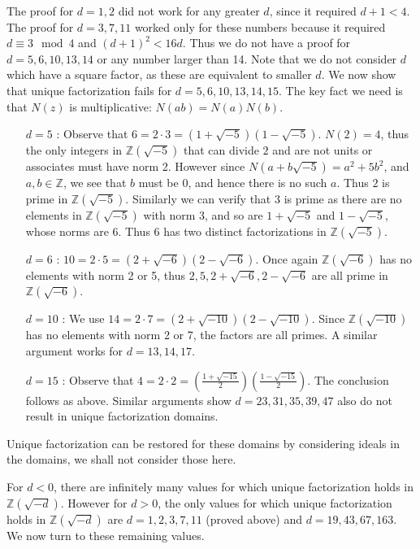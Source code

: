 \documentclass[12pt]{article}
\newcommand{\ints}{{\mathbb{Z}}}
\begin{document}
The proof for $d = 1, 2$ did not work for any greater $d$, since it required $d+1 < 4$. The proof for $d = 3, 7, 11$ worked only for these numbers because it required $d \equiv 3 \mod 4$ and $(d + 1)^2 < 16d$. Thus we do not have a proof for $d = 5, 6, 10, 13, 14$ or any number larger than 14.  Note that we do not consider $d$ which have a square factor, as these are equivalent to smaller $d$. We now show that unique factorization fails for $d = 5, 6, 10, 13, 14, 15$. The key fact we need is that $N(z)$ is multiplicative: $N(ab) = N(a)N(b)$. 
\begin{itemize}
\item[$d = 5$]: Observe that $6 = 2 \cdot 3 = (1 + \sqrt{-5})(1 - \sqrt{-5})$.  $N(2) = 4$, thus the only integers in $\ints(\sqrt{-5})$ that can divide $2$ and are not units or associates must have norm 2. However since $N(a + b\sqrt{-5}) = a^2 + 5b^2$, and $a, b \in \ints$, we see that $b$ must be 0, and hence there is no such $a$. Thus $2$ is prime in $\ints(\sqrt{-5})$.  Similarly we can verify that $3$ is prime as there are no elements in $\ints(\sqrt{-5})$ with norm 3, and so are $1 + \sqrt{-5}$ and $1 - \sqrt{-5}$, whose norms are 6.  Thus $6$ has two distinct factorizations in $\ints(\sqrt{-5})$.
\item[$d = 6$]: $10 = 2\cdot 5 = (2 + \sqrt{-6})(2 - \sqrt{-6})$.  Once again $\ints(\sqrt{-6})$ has no elements with norm 2 or 5, thus $2, 5, 2 + \sqrt{-6}, 2 - \sqrt{-6}$ are all prime in $\ints(\sqrt{-6})$.
\item[$d = 10$]: We use $14 = 2\cdot 7 = (2 + \sqrt{-10})(2 - \sqrt{-10})$. Since $\ints(\sqrt{-10})$ has no elements with norm 2 or 7, the factors are all primes. A similar argument works for $d = 13, 14, 17$.
\item[$d = 15$]: Observe that $4 = 2\cdot 2 = (\frac{1 + \sqrt{-15}}{2})(\frac{1 - \sqrt{-15}}{2})$. The conclusion follows as above. Similar arguments show $d = 23, 31, 35, 39, 47$ also do not result in unique factorization domains.
\end{itemize}
Unique factorization can be restored for these domains by considering ideals in the domains, we shall not consider those here.

For $d < 0$, there are infinitely many values for which unique factorization holds in $\ints(\sqrt{-d})$. However  for $d > 0$, the only values for which unique factorization holds in $\ints(\sqrt{-d})$ are $d = 1, 2, 3, 7, 11$ (proved above) and $d = 19, 43, 67, 163$. We now turn to these remaining values.
\end{document}
